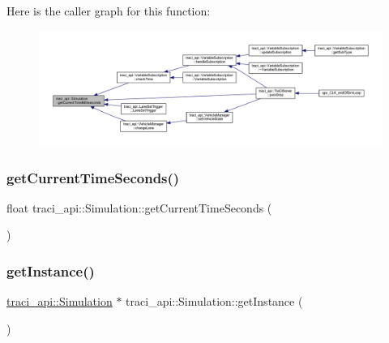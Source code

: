 Here is the caller graph for this function\+:\nopagebreak
\begin{figure}[H]
\begin{center}
\leavevmode
\includegraphics[width=350pt]{classtraci__api_1_1_simulation_a43ce3d282a312c2e6735cdcd4343b0a7_icgraph}
\end{center}
\end{figure}
\mbox{\label{classtraci__api_1_1_simulation_a8e9cc88461dfab200eabf626fcdb8280}} 
\subsubsection{\texorpdfstring{get\+Current\+Time\+Seconds()}{getCurrentTimeSeconds()}}
{\footnotesize\ttfamily float traci\+\_\+api\+::\+Simulation\+::get\+Current\+Time\+Seconds (\begin{DoxyParamCaption}{ }\end{DoxyParamCaption})}

\mbox{\label{classtraci__api_1_1_simulation_a5bd3febd1571525c2dac2b68e37f694e}} 
\subsubsection{\texorpdfstring{get\+Instance()}{getInstance()}}
{\footnotesize\ttfamily \hyperlink{classtraci__api_1_1_simulation}{traci\+\_\+api\+::\+Simulation} $\ast$ traci\+\_\+api\+::\+Simulation\+::get\+Instance (\begin{DoxyParamCaption}{ }\end{DoxyParamCaption})\hspace{0.3cm}{\ttfamily [static]}}

